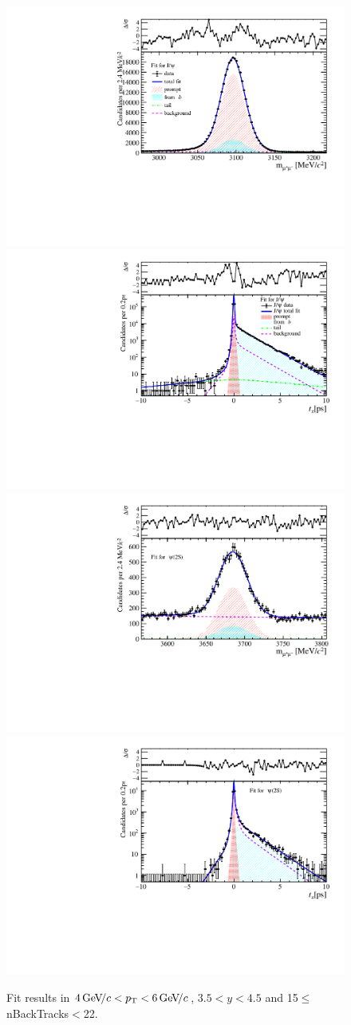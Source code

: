 \begin{figure}[H]
\begin{center}
\includegraphics[width=0.47\linewidth]{pdf/Jpsi/drawmassB/n3y3pt3.pdf}
\includegraphics[width=0.47\linewidth]{pdf/Jpsi/2DFitB/n3y3pt3.pdf}
\vspace*{-0.5cm}
\includegraphics[width=0.47\linewidth]{pdf/Psi2S/drawmassB/n3y3pt3.pdf}
\includegraphics[width=0.47\linewidth]{pdf/Psi2S/2DFitB/n3y3pt3.pdf}
\vspace*{-0.5cm}
\end{center}
\caption{Fit results in $4\text{\,Ge\kern -0.1em V\!/}c<p_{\mathrm{T}}<6\text{\,Ge\kern -0.1em V\!/}c$, $3.5<y<4.5$ and 15$\leq$nBackTracks$<$22.}
\label{Fitn3y3pt3}
\end{figure}
